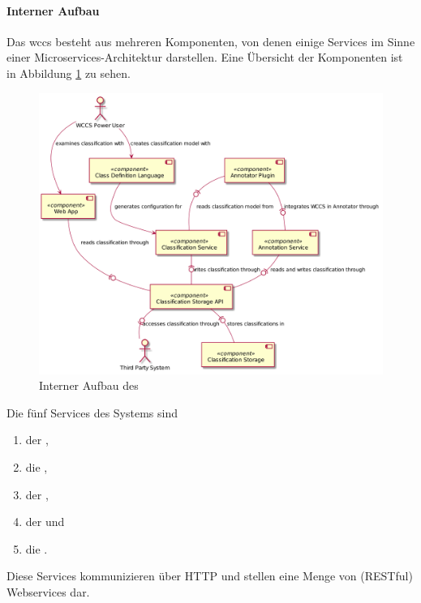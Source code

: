         \paragraph{Interner Aufbau}
        Das \gls{wccs} besteht aus mehreren Komponenten,
        von denen einige Services im Sinne einer Microservices-Architektur darstellen.
        Eine Übersicht der Komponenten ist in Abbildung \ref{image:wccsInternalArchitecture} zu sehen.

        \begin{figure}
            \centering
            \includegraphics[scale=\imageScalingFactor]{../resources/architecture/wccs_internal_architecture.png}
            \caption{Interner Aufbau des }
            \label{image:wccsInternalArchitecture}
        \end{figure}

        Die fünf Services des Systems sind

        \begin{enumerate}
            \item der {\classificationStorage},
            \item die {\classificationStorageAPI},
            \item der {\classificationService},
            \item der {\annotationService} und
            \item die {\webAppService}.
        \end{enumerate}

        Diese Services kommunizieren über HTTP
        und stellen eine Menge von (RESTful) Webservices dar.

